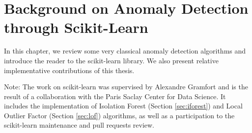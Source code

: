 \chapter{Background on Anomaly Detection through Scikit-Learn}
\label{back:AD_scikit}
\begin{chapabstract}
In this chapter, we review some very classical anomaly detection algorithms and introduce the reader to the scikit-learn library. We also present relative implementative contributions of this thesis.%
\end{chapabstract}

Note: The work on scikit-learn was supervised by Alexandre Gramfort and is the result of a collaboration with the Paris Saclay Center for Data Science. It includes the implementation of Isolation Forest (Section \ref{sec:iforest}) and Local Outlier Factor (Section \ref{sec:lof}) algorithms, as well as a participation to the scikit-learn maintenance and pull requests review.


